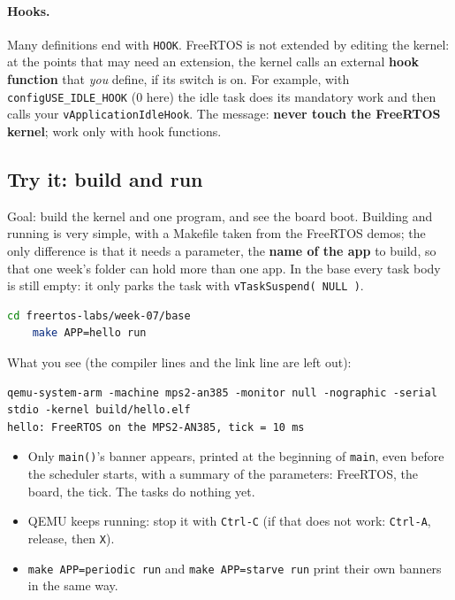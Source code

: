 \paragraph{Hooks.} Many definitions end with \texttt{HOOK}. FreeRTOS is not extended by editing the kernel: at the points that may need an extension, the kernel calls an external \textbf{hook function} that \emph{you} define, if its switch is on. For example, with \texttt{configUSE\_IDLE\_HOOK} (0 here) the idle task does its mandatory work and then calls your \texttt{vApplicationIdleHook}. The message: \textbf{never touch the FreeRTOS kernel}; work only with hook functions.

\subsection{Try it: build and run}
Goal: build the kernel and one program, and see the board boot. Building and running is very simple, with a Makefile taken from the FreeRTOS demos; the only difference is that it needs a parameter, the \textbf{name of the app} to build, so that one week's folder can hold more than one app. In the base every task body is still empty: it only parks the task with \texttt{vTaskSuspend( NULL )}.
\begin{lstlisting}[language=bash]
    cd freertos-labs/week-07/base
    make APP=hello run
\end{lstlisting}
What you see (the compiler lines and the link line are left out):
{\verbatimscriptsize
\begin{verbatim}
qemu-system-arm -machine mps2-an385 -monitor null -nographic -serial stdio -kernel build/hello.elf
hello: FreeRTOS on the MPS2-AN385, tick = 10 ms
\end{verbatim}}
\begin{itemize}
    \item Only \texttt{main()}'s banner appears, printed at the beginning of \texttt{main}, even before the scheduler starts, with a summary of the parameters: FreeRTOS, the board, the tick. The tasks do nothing yet.
    \item QEMU keeps running: stop it with \texttt{Ctrl-C} (if that does not work: \texttt{Ctrl-A}, release, then \texttt{X}).
    \item \texttt{make APP=periodic run} and \texttt{make APP=starve run} print their own banners in the same way.
\end{itemize}

